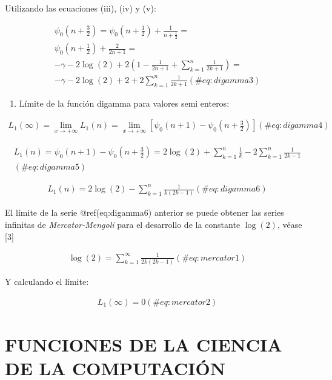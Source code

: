 \documentclass[
  letterpaper,
  DIV=11,
  numbers=noendperiod]{scrreprt}
\providecommand{\tightlist}{%
  \setlength{\itemsep}{0pt}\setlength{\parskip}{0pt}}\usepackage{longtable,booktabs,array}
\begin{document}
Utilizando las ecuaciones (iii), (iv) y (v):

\begin{multline}
\psi_{0}(n+\frac{3}{2}) = 
\psi_{0}(n+\frac{1}{2}) +\frac{1}{n+\frac{1}{2}} = \\ \psi_{0}(n+\frac{1}{2})+\frac{2}{2n+1}=\\
-\gamma-2\log(2) +2(1-\frac{1}{2n+1}+\sum_{k=1}^n{\frac{1}{2k+1}})= \\
-\gamma-2\log(2) +2 +2\sum_{k=1}^{n}{\frac{1}{2k+1}}
(\#eq:digamma3)
\end{multline}

\begin{enumerate}
\def\labelenumi{(\roman{enumi})}
\setcounter{enumi}{6}
\tightlist
\item
  Límite de la función digamma para valores semi enteros:
\end{enumerate}

\begin{multline}
 L_{1}(\infty)=\lim_{x \to{+}\infty}{L_{1}(n)} =
  \lim_{x \to{+}\infty}{[\psi_{0}(n+1)-\psi_{0}(n+\frac{3}{2})] }
(\#eq:digamma4)
\end{multline}

\begin{multline}
L_{1}(n)=\psi_{0}(n+1)-\psi_{0}(n+\frac{3}{2}) =
  2\log(2) + \sum_{k=1}^{n}{\frac{1}{k}}-2 \sum_{k=1}^{n}{\frac{1}{2k-1}} \\
(\#eq:digamma5)
\end{multline}

\begin{multline}
L_{1}(n)=2\log(2)-\sum_{k=1}^{n}{\frac{1}{k(2k-1)}}
(\#eq:digamma6)
\end{multline}

El límite de la serie @ref(eq:digamma6) anterior se puede obtener las
series infinitas de \emph{Mercator-Mengoli} para el desarrollo de la
constante \(\log(2)\), véase {[}3{]}

\begin{multline}
\log(2)=\sum_{k=1}^{\infty}{\frac{1}{2k(2k-1)}}
(\#eq:mercator1)
\end{multline}

Y calculando el límite:

\begin{multline}
L_{1}(\infty)=0
(\#eq:mercator2)
\end{multline}


\hypertarget{funciones-de-la-ciencia-de-la-computaciuxf3n}{%
\chapter{FUNCIONES DE LA CIENCIA DE LA
COMPUTACIÓN}\label{funciones-de-la-ciencia-de-la-computaciuxf3n}}
\end{document}
